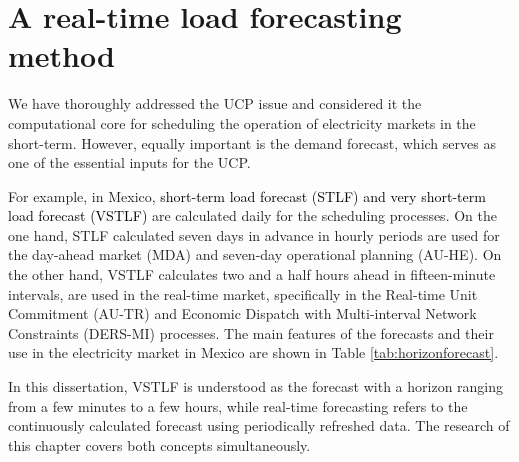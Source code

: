 \chapter{A real-time load forecasting method}
\label{sec:forecasting}

We have thoroughly addressed the UCP issue and considered it the computational core for scheduling the operation of electricity markets in the short-term. However, equally important is the demand forecast, which serves as one of the essential inputs for the UCP.

For example, in Mexico, \textcolor{black}{short-term load forecast (STLF) and very short-term load forecast (VSTLF)} are calculated daily for the scheduling processes. On the one hand, STLF calculated seven days in advance in hourly periods are used for the day-ahead market (MDA) and seven-day operational planning (AU-HE). On the other hand, VSTLF calculates two and a half hours ahead in fifteen-minute intervals, are used in the real-time market, specifically in the Real-time Unit Commitment (AU-TR) and Economic Dispatch with Multi-interval Network Constraints (DERS-MI) processes. The main features of the forecasts and their use in the electricity market in Mexico are shown in Table \ref{tab:horizonforecast}.

In this dissertation, VSTLF is understood as the forecast with a horizon ranging from a few minutes to a few hours, while real-time forecasting refers to the continuously calculated forecast using periodically refreshed data. The research of this chapter covers both concepts simultaneously.

\begin{table}[!htp]\centering
\caption{Electricity demand forecasts in the Mexican market, based on \citep{SENER2017b}.}\label{tab:horizonforecast}
\scriptsize
{}
\end{table}

